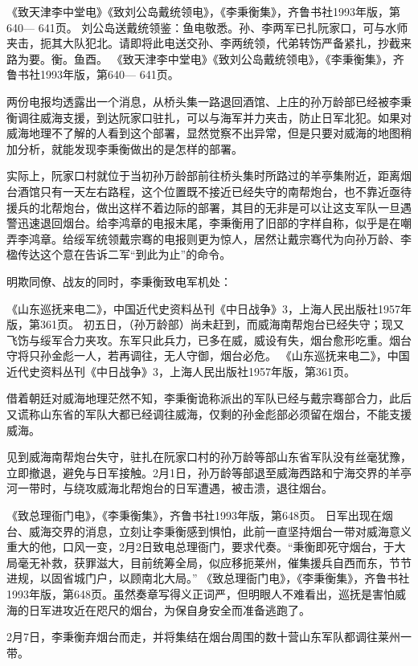 \documentclass[12pt,UTF8]{ctexbook}
\begin{document}
《致天津李中堂电》《致刘公岛戴统领电》，《李秉衡集》，齐鲁书社1993年版，第640— 641页。
刘公岛送戴统领鉴：鱼电敬悉。孙、李两军已扎阮家口，可与水师夹击，扼其大队犯北。请即将此电送交孙、李两统领，代弟转饬严备紧扎，抄截来路为要。衡。鱼酉。 《致天津李中堂电》《致刘公岛戴统领电》，《李秉衡集》，齐鲁书社1993年版，第640— 641页。

两份电报均透露出一个消息，从桥头集一路退回酒馆、上庄的孙万龄部已经被李秉衡调往威海支援，到达阮家口驻扎，可以与海军并力夹击，防止日军北犯。如果对威海地理不了解的人看到这个部署，显然觉察不出异常，但是只要对威海的地图稍加分析，就能发现李秉衡做出的是怎样的部署。

实际上，阮家口村就位于当初孙万龄部前往桥头集时所路过的羊亭集附近，距离烟台酒馆只有一天左右路程，这个位置既不接近已经失守的南帮炮台，也不靠近亟待援兵的北帮炮台，做出这样不着边际的部署，其目的无非是可以让这支军队一旦遇警迅速退回烟台。给李鸿章的电报末尾，李秉衡用了旧部的字样自称，似乎是在嘲弄李鸿章。给绥军统领戴宗骞的电报则更为惊人，居然让戴宗骞代为向孙万龄、李楹传达这个意在告诉二军“到此为止”的命令。

明欺同僚、战友的同时，李秉衡致电军机处：

《山东巡抚来电二》，中国近代史资料丛刊《中日战争》3，上海人民出版社1957年版，第361页。
初五日，（孙万龄部）尚未赶到，而威海南帮炮台已经失守；现又飞饬与绥军合力夹攻。东军只此兵力，已多在威，威设有失，烟台愈形吃重。烟台守将只孙金彪一人，若再调往，无人守御，烟台必危。 《山东巡抚来电二》，中国近代史资料丛刊《中日战争》3，上海人民出版社1957年版，第361页。

借着朝廷对威海地理茫然不知，李秉衡诡称派出的军队已经与戴宗骞部合力，此后又谎称山东省的军队大都已经调往威海，仅剩的孙金彪部必须留在烟台，不能支援威海。

见到威海南帮炮台失守，驻扎在阮家口村的孙万龄等部山东省军队没有丝毫犹豫，立即撤退，避免与日军接触。2月1日，孙万龄等部退至威海西路和宁海交界的羊亭河一带时，与绕攻威海北帮炮台的日军遭遇，被击溃，退往烟台。

《致总理衙门电》，《李秉衡集》，齐鲁书社1993年版，第648页。
日军出现在烟台、威海交界的消息，立刻让李秉衡感到惧怕，此前一直坚持烟台一带对威海意义重大的他，口风一变，2月2日致电总理衙门，要求代奏。“秉衡即死守烟台，于大局毫无补救，获罪滋大，目前统筹全局，似应移扼莱州，催集援兵自西而东，节节进规，以固省城门户，以顾南北大局。” 《致总理衙门电》，《李秉衡集》，齐鲁书社1993年版，第648页。虽然奏章写得义正词严，但明眼人不难看出，巡抚是害怕威海的日军进攻近在咫尺的烟台，为保自身安全而准备逃跑了。

2月7日，李秉衡弃烟台而走，并将集结在烟台周围的数十营山东军队都调往莱州一带。
\end{document}
